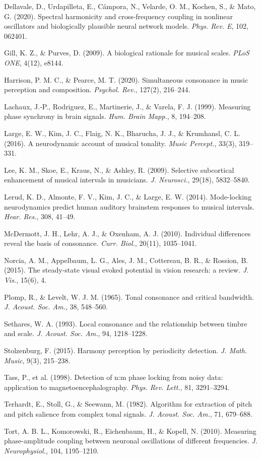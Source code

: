 \documentclass[11pt]{article}
\begin{document}
\begin{list}{}{\setlength{\itemsep}{1pt}\setlength{\leftmargin}{1.2em}\setlength{\itemindent}{-1.2em}}
\item Dellavale, D., Urdapilleta, E., Cámpora, N., Velarde, O. M., Kochen, S., \& Mato, G. (2020). Spectral harmonicity and cross-frequency coupling in nonlinear oscillators and biologically plausible neural network models. \emph{Phys. Rev. E}, 102, 062401.
\item Gill, K. Z., \& Purves, D. (2009). A biological rationale for musical scales. \emph{PLoS ONE}, 4(12), e8144.
\item Harrison, P. M. C., \& Pearce, M. T. (2020). Simultaneous consonance in music perception and composition. \emph{Psychol. Rev.}, 127(2), 216–244.
\item Lachaux, J.-P., Rodriguez, E., Martinerie, J., \& Varela, F. J. (1999). Measuring phase synchrony in brain signals. \emph{Hum. Brain Mapp.}, 8, 194–208.
\item Large, E. W., Kim, J. C., Flaig, N. K., Bharucha, J. J., \& Krumhansl, C. L. (2016). A neurodynamic account of musical tonality. \emph{Music Percept.}, 33(3), 319–331.
\item Lee, K. M., Skoe, E., Kraus, N., \& Ashley, R. (2009). Selective subcortical enhancement of musical intervals in musicians. \emph{J. Neurosci.}, 29(18), 5832–5840.
\item Lerud, K. D., Almonte, F. V., Kim, J. C., \& Large, E. W. (2014). Mode-locking neurodynamics predict human auditory brainstem responses to musical intervals. \emph{Hear. Res.}, 308, 41–49.
\item McDermott, J. H., Lehr, A. J., \& Oxenham, A. J. (2010). Individual differences reveal the basis of consonance. \emph{Curr. Biol.}, 20(11), 1035–1041.
\item Norcia, A. M., Appelbaum, L. G., Ales, J. M., Cottereau, B. R., \& Rossion, B. (2015). The steady-state visual evoked potential in vision research: a review. \emph{J. Vis.}, 15(6), 4.
\item Plomp, R., \& Levelt, W. J. M. (1965). Tonal consonance and critical bandwidth. \emph{J. Acoust. Soc. Am.}, 38, 548–560.
\item Sethares, W. A. (1993). Local consonance and the relationship between timbre and scale. \emph{J. Acoust. Soc. Am.}, 94, 1218–1228.
\item Stolzenburg, F. (2015). Harmony perception by periodicity detection. \emph{J. Math. Music}, 9(3), 215–238.
\item Tass, P., et al. (1998). Detection of n:m phase locking from noisy data: application to magnetoencephalography. \emph{Phys. Rev. Lett.}, 81, 3291–3294.
\item Terhardt, E., Stoll, G., \& Seewann, M. (1982). Algorithm for extraction of pitch and pitch salience from complex tonal signals. \emph{J. Acoust. Soc. Am.}, 71, 679–688.
\item Tort, A. B. L., Komorowski, R., Eichenbaum, H., \& Kopell, N. (2010). Measuring phase-amplitude coupling between neuronal oscillations of different frequencies. \emph{J. Neurophysiol.}, 104, 1195–1210.
\end{list}\endgroup
\end{document}
